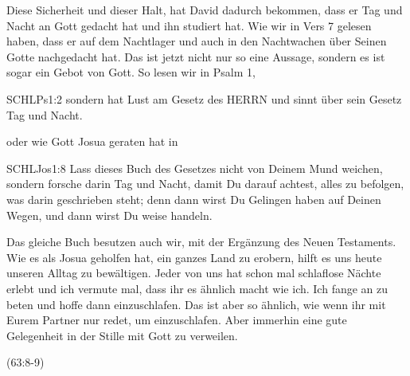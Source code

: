 \documentclass[14pt]{../../inc/mybib}
\begin{document}
    \begin{block}
        Diese Sicherheit und dieser Halt, hat David dadurch bekommen, dass er Tag und Nacht an Gott gedacht hat und ihn studiert hat. Wie wir in Vers 7 gelesen haben, dass er auf dem Nachtlager und auch in den Nachtwachen über Seinen Gotte nachgedacht hat. Das ist jetzt nicht nur so eine Aussage, sondern es ist sogar ein Gebot von Gott. So lesen wir in Psalm 1,
        \begin{bibelbox}{SCHL}{Ps}{1:2}
            sondern hat Lust am Gesetz des HERRN und sinnt über sein Gesetz Tag und Nacht.
        \end{bibelbox}
        oder wie Gott Josua geraten hat in
        \begin{bibelbox}{SCHL}{Jos}{1:8}
            Lass dieses Buch des Gesetzes nicht von Deinem Mund weichen, sondern forsche darin Tag und Nacht, damit Du darauf achtest, alles zu befolgen, was darin geschrieben steht; denn dann wirst Du Gelingen haben auf Deinen Wegen, und dann wirst Du weise handeln.
        \end{bibelbox}
        Das gleiche Buch besutzen auch wir, mit der Ergänzung des Neuen Testaments. Wie es als Josua geholfen hat, ein ganzes Land zu erobern, hilft es uns heute unseren Alltag zu bewältigen.
        Jeder von uns hat schon mal schlaflose Nächte erlebt und ich vermute mal, dass ihr es ähnlich macht wie ich. Ich fange an zu beten und hoffe dann einzuschlafen. Das ist aber so ähnlich, wie wenn ihr mit Eurem Partner nur redet, um einzuschlafen. Aber immerhin eine gute Gelegenheit in der Stille mit Gott zu verweilen.
    \end{block}
    (63:8-9)
\end{document}
